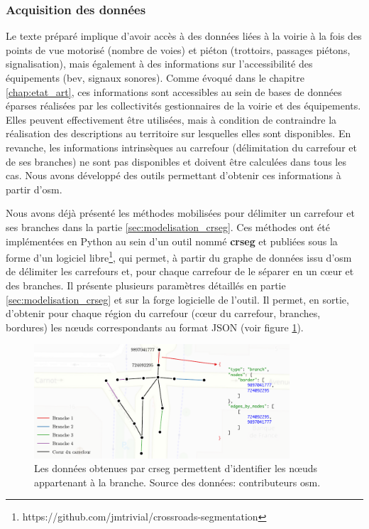 \subsubsection{Acquisition des données}

Le texte préparé implique d'avoir accès à des données liées à la voirie à la fois des points de vue motorisé (nombre de voies) et piéton (trottoirs, passages piétons, signalisation), mais également à des informations sur l'accessibilité des équipements (\gls{bev}, signaux sonores). Comme évoqué dans le chapitre \ref{chap:etat_art}, ces informations sont accessibles au sein de bases de données éparses réalisées par les collectivités gestionnaires de la voirie et des équipements. Elles peuvent effectivement être utilisées, mais à condition de contraindre la réalisation des descriptions au territoire sur lesquelles elles sont disponibles. En revanche, les informations intrinsèques au carrefour (délimitation du carrefour et de ses branches) ne sont pas disponibles et doivent être calculées dans tous les cas. Nous avons développé des outils permettant d'obtenir ces informations à partir d'\gls{osm}.

\newpar{}

Nous avons déjà présenté les méthodes mobilisées pour délimiter un carrefour et ses branches dans la partie \ref{sec:modelisation_crseg}. Ces méthodes ont été implémentées en Python au sein d'un outil nommé \textbf{crseg} et publiées sous la forme d'un logiciel libre\footnote{https://github.com/jmtrivial/crossroads-segmentation}, qui permet, à partir du graphe de données issu d'\gls{osm} de délimiter les carrefours et, pour chaque carrefour de le séparer en un cœur et des branches. Il présente plusieurs paramètres détaillés en partie \ref{sec:modelisation_crseg} et sur la forge logicielle de l'outil. Il permet, en sortie, d'obtenir pour chaque région du carrefour (cœur du carrefour, branches, bordures) les nœuds correspondants au format JSON (voir figure \ref{fig:experimentation_crseg_json}).

\begin{figure}[ht]
    \centering
    \includegraphics[width=0.85\textwidth]{images/experimentation/donnees_crseg.pdf}
    \caption[Données produites par crseg]{Les données obtenues par crseg permettent d'identifier les nœuds appartenant à la branche. Source des données: contributeurs \gls{osm}.}
    \label{fig:experimentation_crseg_json}
\end{figure}

